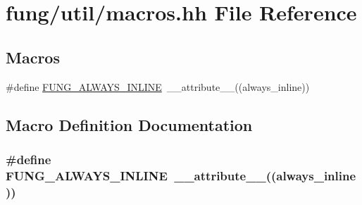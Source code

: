 \hypertarget{macros_8hh}{}\section{fung/util/macros.hh File Reference}
\label{macros_8hh}
\subsection*{Macros}
\begin{DoxyCompactItemize}
\item 
\#define \hyperlink{macros_8hh_a03b9da186125795e5afa49d0ef1cc32f}{F\+U\+N\+G\+\_\+\+A\+L\+W\+A\+Y\+S\+\_\+\+I\+N\+L\+I\+NE}~\+\_\+\+\_\+attribute\+\_\+\+\_\+((always\+\_\+inline))
\end{DoxyCompactItemize}


\subsection{Macro Definition Documentation}
\subsubsection[{\texorpdfstring{F\+U\+N\+G\+\_\+\+A\+L\+W\+A\+Y\+S\+\_\+\+I\+N\+L\+I\+NE}{FUNG_ALWAYS_INLINE}}]{\setlength{\rightskip}{0pt plus 5cm}\#define F\+U\+N\+G\+\_\+\+A\+L\+W\+A\+Y\+S\+\_\+\+I\+N\+L\+I\+NE~\+\_\+\+\_\+attribute\+\_\+\+\_\+((always\+\_\+inline))}\hypertarget{macros_8hh_a03b9da186125795e5afa49d0ef1cc32f}{}\label{macros_8hh_a03b9da186125795e5afa49d0ef1cc32f}
